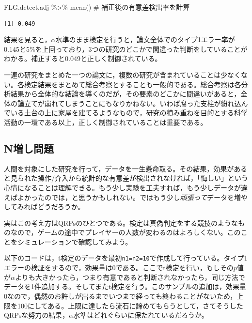 \documentclass[
  a4paper,
]{ltjsbook}
\newenvironment{Shaded}{\begin{snugshade}}{\end{snugshade}}
\newcommand{\CommentTok}[1]{\textcolor[rgb]{0.37,0.37,0.37}{#1}}
\newcommand{\FunctionTok}[1]{\textcolor[rgb]{0.28,0.35,0.67}{#1}}
\newcommand{\NormalTok}[1]{\textcolor[rgb]{0.00,0.23,0.31}{#1}}
\newcommand{\SpecialCharTok}[1]{\textcolor[rgb]{0.37,0.37,0.37}{#1}}
\begin{document}
\begin{Shaded}
\begin{Highlighting}[]
\NormalTok{FLG.detect.adj }\SpecialCharTok{\%\textgreater{}\%} \FunctionTok{mean}\NormalTok{() }\CommentTok{\# 補正後の有意差検出率を計算}
\end{Highlighting}
\end{Shaded}

\begin{verbatim}
[1] 0.049
\end{verbatim}

結果を見ると，\(\alpha\)水準のまま検定を行うと，論文全体でのタイプ1エラー率が0.145と5\%を上回っており，3つの研究のどこかで間違った判断をしていることがわかる。補正すると0.049と正しく制御されている。

一連の研究をまとめた一つの論文に，複数の研究が含まれていることは少なくない。各検定結果をまとめて総合考察とすることも一般的である。総合考察は各分析結果から全体的な結論を導くのだが，その要素のどこかに間違いがあると，全体の論立てが崩れてしまうことにもなりかねない。いわば腐った支柱が紛れ込んでいる土台の上に家屋を建てるようなもので，研究の積み重ねを目的とする科学活動の一環である以上，正しく制御されていることは重要である。

\subsection{N増し問題}\label{nux5897ux3057ux554fux984c}

人間を対象にした研究を行って，データを一生懸命取る。その結果，効果があると見られた操作/介入から統計的な有意差が検出されなければ，「悔しい」という心情になることは理解できる。もう少し実験を工夫すれば，もう少しデータが違えばよかったのでは，と思うかもしれない。ではもう少し\emph{頑張って}データを増やしてみればどうだろうか。

実はこの考え方はQRPsのひとつである。検定は真偽判定をする競技のようなものなので，ゲームの途中でプレイヤーの人数が変わるのはよろしくない。このことをシミュレーションで確認してみよう。

以下のコードは，t検定のデータを最初\texttt{n1=n2=10}で作成して行っている。タイプ1エラーの検証をするので，効果量は\(0\)である。ここでt検定を行い，もしその\(p\)値が\(\alpha\)よりも大きかったら，つまり有意であると判断されなかったら，同じ方法でデータを1件追加する。そしてまたt検定を行う。このサンプルの追加は，効果量\(0\)なので，偶然のお許しが出るまでいつまで経っても終わることがないため，上限を100にしてある。上限に達したら流石に諦めてもらうとして，さてそうしたQRPsな努力の結果，\(\alpha\)水準はどれぐらいに保たれているだろうか。
\end{document}
